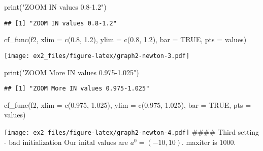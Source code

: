 \documentclass[
]{article}
\newenvironment{Shaded}{\begin{snugshade}}{\end{snugshade}}
\newcommand{\AttributeTok}[1]{\textcolor[rgb]{0.77,0.63,0.00}{#1}}
\newcommand{\ConstantTok}[1]{\textcolor[rgb]{0.00,0.00,0.00}{#1}}
\newcommand{\FloatTok}[1]{\textcolor[rgb]{0.00,0.00,0.81}{#1}}
\newcommand{\FunctionTok}[1]{\textcolor[rgb]{0.00,0.00,0.00}{#1}}
\newcommand{\NormalTok}[1]{#1}
\newcommand{\StringTok}[1]{\textcolor[rgb]{0.31,0.60,0.02}{#1}}
\begin{document}
\begin{Shaded}
\begin{Highlighting}[]
\FunctionTok{print}\NormalTok{(}\StringTok{"ZOOM IN values 0.8{-}1.2"}\NormalTok{)}
\end{Highlighting}
\end{Shaded}

\begin{verbatim}
## [1] "ZOOM IN values 0.8-1.2"
\end{verbatim}

\begin{Shaded}
\begin{Highlighting}[]
\FunctionTok{cf\_func}\NormalTok{(f2, }\AttributeTok{xlim =} \FunctionTok{c}\NormalTok{(}\FloatTok{0.8}\NormalTok{, }\FloatTok{1.2}\NormalTok{), }\AttributeTok{ylim =} \FunctionTok{c}\NormalTok{(}\FloatTok{0.8}\NormalTok{, }\FloatTok{1.2}\NormalTok{), }\AttributeTok{bar =} \ConstantTok{TRUE}\NormalTok{, }\AttributeTok{pts =}\NormalTok{ values)}
\end{Highlighting}
\end{Shaded}

\texttt{[image: ex2\_files/figure-latex/graph2-newton-3.pdf]}

\begin{Shaded}
\begin{Highlighting}[]
\FunctionTok{print}\NormalTok{(}\StringTok{"ZOOM More IN values 0.975{-}1.025"}\NormalTok{)}
\end{Highlighting}
\end{Shaded}

\begin{verbatim}
## [1] "ZOOM More IN values 0.975-1.025"
\end{verbatim}

\begin{Shaded}
\begin{Highlighting}[]
\FunctionTok{cf\_func}\NormalTok{(f2, }\AttributeTok{xlim =} \FunctionTok{c}\NormalTok{(}\FloatTok{0.975}\NormalTok{, }\FloatTok{1.025}\NormalTok{), }\AttributeTok{ylim =} \FunctionTok{c}\NormalTok{(}\FloatTok{0.975}\NormalTok{, }\FloatTok{1.025}\NormalTok{), }\AttributeTok{bar =} \ConstantTok{TRUE}\NormalTok{, }\AttributeTok{pts =}\NormalTok{ values)}
\end{Highlighting}
\end{Shaded}

\texttt{[image: ex2\_files/figure-latex/graph2-newton-4.pdf]} \#\#\#\#
Third setting - bad initialization Our inital values are
\(a^{0}=(-10, 10)\). maxiter is \(1000\).
\end{document}
